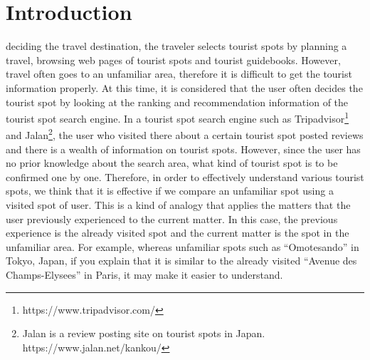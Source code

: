 \documentclass[journal]{IAENGtran}
\begin{document}
\section{Introduction}
\label{sec:Introduction}
 deciding the travel destination, the traveler selects tourist spots by planning a travel, browsing web pages of tourist spots and tourist guidebooks.
However, travel often goes to an unfamiliar area, therefore it is difficult to get the tourist information properly.
At this time, it is considered that the user often decides the tourist spot by looking at the ranking and recommendation information of the tourist spot search engine.
In a tourist spot search engine such as Tripadvisor\footnote{https://www.tripadvisor.com/} and Jalan\footnote{Jalan is a review posting site on tourist spots in Japan. https://www.jalan.net/kankou/}, the user who visited there about a certain tourist spot posted reviews and there is a wealth of information on tourist spots.
However, since the user has no prior knowledge about the search area, what kind of tourist spot is to be confirmed one by one.
Therefore, in order to effectively understand various tourist spots, we think that it is effective if we compare an unfamiliar spot using a visited spot of user.
This is a kind of analogy that applies the matters that the user previously experienced to the current matter. In this case, the previous experience is the already visited spot and the current matter is the spot in the unfamiliar area.
For example, whereas unfamiliar spots such as ``Omotesando'' in Tokyo, Japan, if you explain that it is similar to the already visited ``Avenue des Champs-Elysees'' in Paris, it may make it easier to understand.
\end{document}
